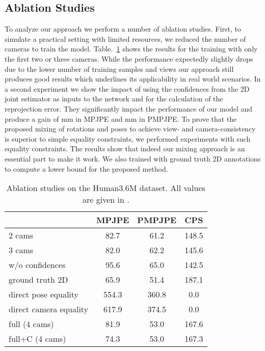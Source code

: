 \documentclass[final]{cvpr}
\begin{document}
\subsection{Ablation Studies}
To analyze our approach we perform a number of ablation studies.
First, to simulate a practical setting with limited resources, we reduced the number of cameras to train the model.
Table.~\ref{tab:ablations} shows the results for the training with only the first two or three cameras.
While the performance expectedly slightly drops due to the lower number of training samples and views our approach still produces good results which underlines its applicability in real world scenarios.
In a second experiment we show the impact of using the confidences from the 2D joint estimator as inputs to the network and for the calculation of the reprojection error.
They significantly impact the performance of our model and produce a gain of mm in MPJPE and mm in PMPJPE.
To prove that the proposed mixing of rotations and poses to achieve view- and camera-consistency is superior to simple equality constraints, we performed experiments with such equality constraints.
The results show that indeed our mixing approach is an essential part to make it work.
We also trained with ground truth 2D annotations to compute a lower bound for the proposed method.
\begin{table}[h!tp]
	\footnotesize
    \caption{Ablation studies on the Human3.6M dataset. All values are given in .}
	\centering
    \begin{tabular}{ l | c c c }
                                & MPJPE     & PMPJPE & CPS \\
        \hline
        2 cams                  & 82.7 & 61.2 & 148.5 \\
        3 cams                  & 82.0 & 62.2 & 145.6 \\
        w/o confidences         & 95.6 & 65.0 & 142.5 \\
        ground truth 2D         & 65.9 & 51.4 & 187.1\\
        direct pose equality    & 554.3     & 360.8 & 0.0  \\
        direct camera equality  & 617.9     & 374.5 & 0.0  \\
        full (4 cams)           & 81.9 & 53.0 & 167.6 \\
        full+C (4 cams)         & 74.3 & 53.0 & 167.3 \\
    \end{tabular}
    \label{tab:ablations}
\end{table}
\end{document}
